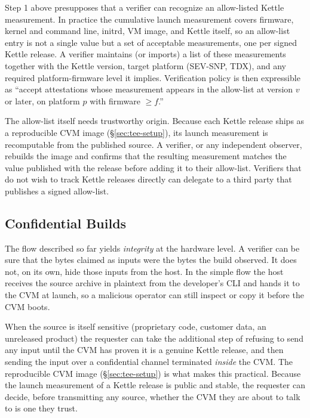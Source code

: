 \documentclass[11pt]{article}
\begin{document}
Step 1 above presupposes that a verifier can recognize an allow-listed Kettle measurement. In practice the cumulative launch measurement covers firmware, kernel and command line, initrd, VM image, and Kettle itself, so an allow-list entry is not a single value but a set of acceptable measurements, one per signed Kettle release. A verifier maintains (or imports) a list of these measurements together with the Kettle version, target platform (SEV-SNP, TDX), and any required platform-firmware level it implies. Verification policy is then expressible as ``accept attestations whose measurement appears in the allow-list at version $v$ or later, on platform $p$ with firmware $\geq f$.''

The allow-list itself needs trustworthy origin. Because each Kettle release ships as a reproducible CVM image (\S\ref{sec:tee-setup}), its launch measurement is recomputable from the published source. A verifier, or any independent observer, rebuilds the image and confirms that the resulting measurement matches the value published with the release before adding it to their allow-list. Verifiers that do not wish to track Kettle releases directly can delegate to a third party that publishes a signed allow-list.

\subsection{Confidential Builds}
\label{sec:confidential-builds}

The flow described so far yields \emph{integrity} at the hardware level. A verifier can be sure that the bytes claimed as inputs were the bytes the build observed. It does not, on its own, hide those inputs from the host. In the simple flow the host receives the source archive in plaintext from the developer's CLI and hands it to the CVM at launch, so a malicious operator can still inspect or copy it before the CVM boots.

When the source is itself sensitive (proprietary code, customer data, an unreleased product) the requester can take the additional step of refusing to send any input until the CVM has proven it is a genuine Kettle release, and then sending the input over a confidential channel terminated \emph{inside} the CVM. The reproducible CVM image (\S\ref{sec:tee-setup}) is what makes this practical. Because the launch measurement of a Kettle release is public and stable, the requester can decide, before transmitting any source, whether the CVM they are about to talk to is one they trust.
\end{document}
